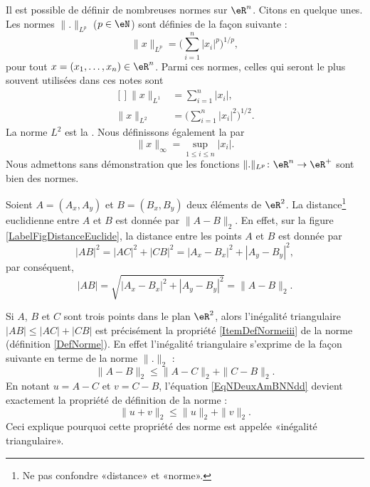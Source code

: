 Il est possible de définir de nombreuses normes sur $\eR^n$. Citons en quelque unes. Les normes $\| . \|_{L^p}$ ($p\in\eN$) sont définies de la façon suivante :
\begin{equation}		\label{EqDeformeLp}
	\| x \|_{L^p}=\Big( \sum_{i=1}^n| x_i |^p\Big)^{1/p},
\end{equation}
pour tout $x=(x_1,\ldots,x_n)\in\eR^n$. Parmi ces normes, celles qui seront le plus souvent utilisées dans ces notes sont
\begin{equation}
	\begin{aligned}[]
		\| x \|_{L^1}&=\sum_{i=1}^n| x_i |,\\
		\| x \|_{L^2}&=\Big( \sum_{i=1}^n| x_i |^2 \Big)^{1/2}.
	\end{aligned}
\end{equation}
La norme $L^2$ est la . Nous définissons également la  par
\begin{equation}
	\| x \|_{\infty}=\sup_{1\leq i\leq n}| x_i |.
\end{equation}
Nous admettons sans démonstration que les fonctions $\| . \|_{L^p}\colon \eR^n\to \eR^+$ sont bien des normes.

\newcommand{\CaptionFigDistanceEuclide}{La \emph{norme} euclidienne induit la \emph{distance} euclidienne. D'où son nom. Le point $C$ est construit aux coordonnées $(A_x,B_y)$.}


Soient $A=(A_x,A_y)$ et $B=(B_x,B_y)$ deux éléments de $\eR^2$. La distance\footnote{Ne pas confondre «distance» et «norme».} euclidienne entre $A$ et $B$ est donnée par $\| A-B \|_2$. En effet, sur la figure \ref{LabelFigDistanceEuclide}, la distance entre les points $A$ et $B$ est donnée par
\begin{equation}
	| AB |^2=| AC |^2+| CB |^2=| A_x-B_x |^2+| A_y-B_y |^2,
\end{equation}
par conséquent,
\begin{equation}
	| AB |=\sqrt{| A_x-B_x |^2+| A_y-B_y |^2}=\| A-B \|_2.
\end{equation}

\begin{remark}
	Si $A$, $B$ et $C$ sont trois points dans le plan $\eR^2$, alors l'inégalité triangulaire $| AB |\leq| AC |+| CB |$ est précisément la propriété \ref{ItemDefNormeiii} de la norme (définition \ref{DefNorme}). En effet l'inégalité triangulaire s'exprime de la façon suivante en terme de la norme $\| . \|_2$ :
	\begin{equation}	\label{EqNDeuxAmBNNdd}
		\| A-B \|_2\leq \| A-C \|_2+\| C-B \|_2.
	\end{equation}
	En notant $u=A-C$ et $v=C-B$, l'équation \eqref{EqNDeuxAmBNNdd} devient exactement la propriété de définition de la norme :
	\begin{equation}
		\| u+v \|_2\leq \| u \|_2+\| v \|_2.
	\end{equation}
	Ceci explique pourquoi cette propriété des norme est appelée «inégalité triangulaire».
\end{remark}

